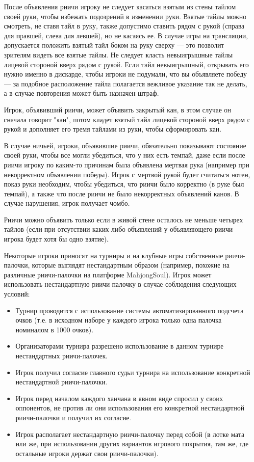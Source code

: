 После объявления риичи игроку не следует касаться взятым из стены тайлом своей руки, чтобы избежать подозрений в изменении руки. Взятые тайлы можно смотреть, не ставя тайл в руку, также допустимо ставить рядом с рукой (справа для правшей, слева для левшей), но не касаясь ее. В случае игры на трансляции, допускается положить взятый тайл боком на руку сверху --- это позволит зрителям видеть все взятые тайлы. Не следует класть невыигрышные тайлы лицевой стороной вверх рядом с рукой. Если тайл невыигрышный, открывать его нужно именно в дискарде, чтобы игроки не подумали, что вы объявляете победу --- за подобное расположение тайла полагается вежливое указание так не делать, а в случае повторения может быть назначен штраф.

Игрок, объявивший риичи, может объявить закрытый кан, в этом случае он сначала говорит "кан", потом кладет взятый тайл лицевой стороной вверх рядом с рукой и дополняет его тремя тайлами из руки, чтобы сформировать кан.

В случае ничьей, игроки, объявившие риичи, обязательно показывают состояние своей руки, чтобы все могли убедиться, что у них есть темпай, даже если после риичи игроку по каким-то причинам была объявлена мертвая рука (например при некорректном объявлении победы). Игрок с мертвой рукой будет считаться нотен, показ руки необходим, чтобы убедиться, что риичи было корректно (в руке был темпай), а также что после риичи не было некорректных объявлений канов. В случае нарушения, игрок получает чомбо.

Риичи можно объявить только если в живой стене осталось не меньше четырех тайлов (если при отсутствии каких либо объявлений у объявляющего риичи игрока будет хотя бы одно взятие). 

\newpage

Некоторые игроки приносят на турниры и на клубные игры собственные риичи-палочки, которые выглядят нестандартным образом (например, похожие на различные риичи-палочки на платформе MahjongSoul). Игрок может использовать нестандартную риичи-палочку в случае соблюдения следующих условий:

\begin{itemize}
	\item Турнир проводится с использование системы автоматизированного подсчета очков (т.е. в исходном наборе у каждого игрока только одна палочка номиналом в 1000 очков).
	\item Организаторами турнира разрешено использование в данном турнире нестандартных риичи-палочек.
	\item Игрок получил согласие главного судьи турнира на использование конкретной нестандартной риичи-палочки.
	\item Игрок перед началом каждого ханчана в явном виде спросил у своих оппонентов, не против ли они использования его конкретной нестандартной риичи-палочки и получил их согласие.
	\item Игрок располагает нестандартную риичи-палочку перед собой (в лотке мата или же, при использовании других вариантов игрового покрытия, там же, где остальные игроки держат свои риичи-палочки).
\end{itemize}

